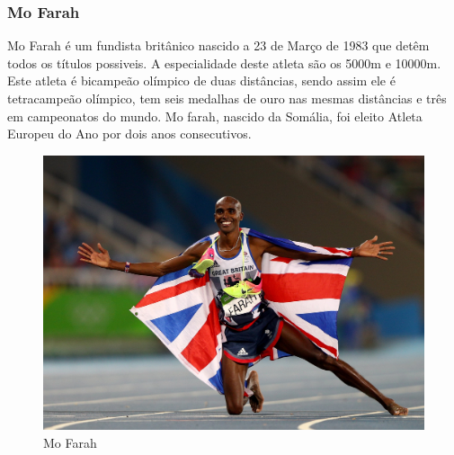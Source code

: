 \documentclass{report}
\begin{document}
        \subsubsection{Mo Farah}
        Mo Farah é um fundista britânico nascido a 23 de Março de 1983 que detêm todos os títulos possiveis. A especialidade deste atleta são os 5000m e 10000m. Este atleta é bicampeão olímpico de duas distâncias, sendo assim ele é tetracampeão olímpico, tem seis medalhas de ouro nas mesmas distâncias e três em campeonatos do mundo. Mo farah, nascido da Somália, foi eleito Atleta Europeu do Ano por dois anos consecutivos. \cite{mofarah}
        \FloatBarrier
            \begin{figure}[h]
            \center
            \includegraphics[scale=.09,angle=0]{mofarah.jpg}
            \caption{Mo Farah}
            \label{fig:Bolt.2}
            \end{figure}
        \FloatBarrier
        
        
\end{document}
